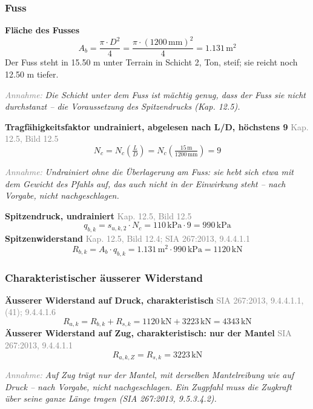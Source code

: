 \documentclass[11pt,a4paper]{article}
\newcommand{\normref}[1]{{\small\textcolor{gray}{#1}}}
\newcommand{\hinweis}[2]{\par\noindent\textcolor{gray}{\textit{#1:}} \textit{#2}\par}
\begin{document}
\subsubsection{Fuss}
\noindent\textbf{Fläche des Fusses}
\begin{equation*}
A_b = \frac{\pi \cdot D^{2}}{4} = \frac{\pi \cdot \left(1200\,\mathrm{mm}\right)^{2}}{4} = 1.131\,\mathrm{m}^{2}
\end{equation*}
Der Fuss steht in 15.50 m unter Terrain in Schicht 2, Ton, steif; sie reicht noch 12.50 m tiefer.

\hinweis{Annahme}{Die Schicht unter dem Fuss ist mächtig genug, dass der Fuss sie nicht durchstanzt -- die Voraussetzung des Spitzendrucks (Kap. 12.5).}
\noindent\textbf{Tragfähigkeitsfaktor undrainiert, abgelesen nach L/D, höchstens 9} \hfill \normref{Kap. 12.5, Bild 12.5}
\begin{equation*}
N_c = N_c\left(\tfrac{L}{D}\right) = N_c\left(\tfrac{15\,\mathrm{m}}{1200\,\mathrm{mm}}\right) = 9
\end{equation*}
\hinweis{Annahme}{Undrainiert ohne die Überlagerung am Fuss: sie hebt sich etwa mit dem Gewicht des Pfahls auf, das auch nicht in der Einwirkung steht -- nach Vorgabe, nicht nachgeschlagen.}
\noindent\textbf{Spitzendruck, undrainiert} \hfill \normref{Kap. 12.5, Bild 12.5}
\begin{equation*}
q_{b,k} = s_{u,k,2} \cdot N_c = 110\,\mathrm{kPa} \cdot 9 = 990\,\mathrm{kPa}
\end{equation*}
\noindent\textbf{Spitzenwiderstand} \hfill \normref{Kap. 12.5, Bild 12.4; SIA 267:2013, 9.4.4.1.1}
\begin{equation*}
R_{b,k} = A_b \cdot q_{b,k} = 1.131\,\mathrm{m}^{2} \cdot 990\,\mathrm{kPa} = 1120\,\mathrm{kN}
\end{equation*}
\subsubsection{Charakteristischer äusserer Widerstand}
\noindent\textbf{Äusserer Widerstand auf Druck, charakteristisch} \hfill \normref{SIA 267:2013, 9.4.4.1.1, (41); 9.4.4.1.6}
\begin{equation*}
R_{a,k} = R_{b,k} + R_{s,k} = 1120\,\mathrm{kN} + 3223\,\mathrm{kN} = 4343\,\mathrm{kN}
\end{equation*}
\noindent\textbf{Äusserer Widerstand auf Zug, charakteristisch: nur der Mantel} \hfill \normref{SIA 267:2013, 9.4.4.1.1}
\begin{equation*}
R_{a,k,Z} = R_{s,k} = 3223\,\mathrm{kN}
\end{equation*}
\hinweis{Annahme}{Auf Zug trägt nur der Mantel, mit derselben Mantelreibung wie auf Druck -- nach Vorgabe, nicht nachgeschlagen. Ein Zugpfahl muss die Zugkraft über seine ganze Länge tragen (SIA 267:2013, 9.5.3.4.2).}
\end{document}

